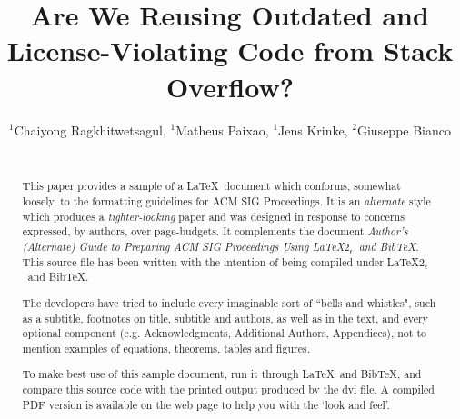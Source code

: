 \documentclass[sigconf,review, anonymous]{acmart}
\begin{document}






%

\title{Are We Reusing Outdated and License-Violating Code from Stack Overflow?}

\author{
	\alignauthor
	$^1$Chaiyong Ragkhitwetsagul, $^1$Matheus Paixao, $^1$Jens Krinke, $^2$Giuseppe Bianco \\
	\\
}


\maketitle

\begin{abstract}
This paper provides a sample of a \LaTeX\ document which conforms,
somewhat loosely, to the formatting guidelines for
ACM SIG Proceedings. It is an {\em alternate} style which produces
a {\em tighter-looking} paper and was designed in response to
concerns expressed, by authors, over page-budgets.
It complements the document \textit{Author's (Alternate) Guide to
Preparing ACM SIG Proceedings Using \LaTeX$2_\epsilon$\ and Bib\TeX}.
This source file has been written with the intention of being
compiled under \LaTeX$2_\epsilon$\ and BibTeX.

The developers have tried to include every imaginable sort
of ``bells and whistles", such as a subtitle, footnotes on
title, subtitle and authors, as well as in the text, and
every optional component (e.g. Acknowledgments, Additional
Authors, Appendices), not to mention examples of
equations, theorems, tables and figures.

To make best use of this sample document, run it through \LaTeX\
and BibTeX, and compare this source code with the printed
output produced by the dvi file. A compiled PDF version
is available on the web page to help you with the
`look and feel'.
\end{abstract}
\end{document}
